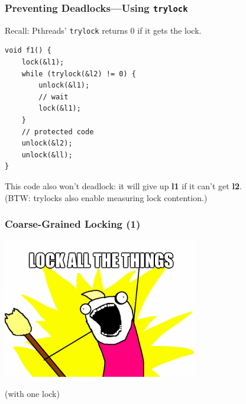 \begin{frame}[fragile]
  \frametitle{Preventing Deadlocks---Using {\tt trylock}}

  
  Recall: Pthreads' {\tt trylock} returns 0 if it gets the lock.

  \begin{lstlisting}
void f1() {
    lock(&l1);
    while (trylock(&l2) != 0) {
        unlock(&l1);
        // wait
        lock(&l1);
    }
    // protected code
    unlock(&l2);
    unlock(&ll);    
}
  \end{lstlisting}

    This code also won't deadlock: it will give up {\bf l1} if it can't get
    {\bf l2}.\\[1em]

    (BTW: trylocks also enable measuring lock contention.)

  
\end{frame}

\begin{frame}
  \frametitle{Coarse-Grained Locking (1)}

  \begin{center}
    \includegraphics[scale=0.5]{images/lock-all-the-things}

    (with one lock)
  \end{center}
\end{frame}

